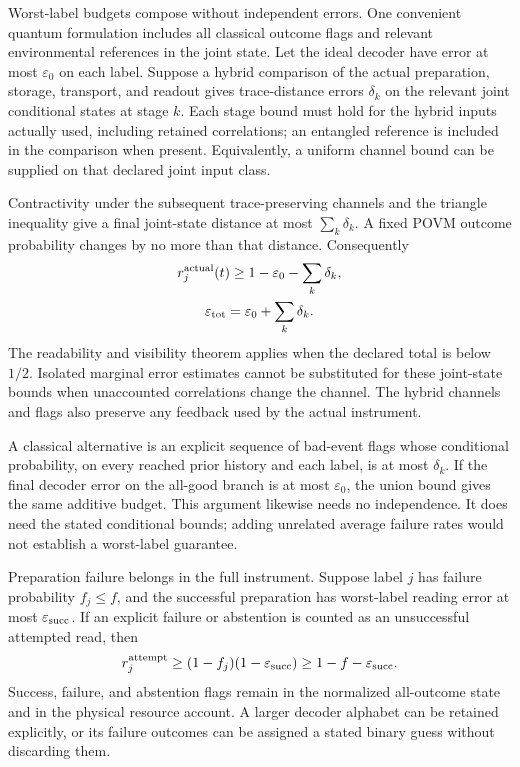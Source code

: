 Worst-label budgets compose without independent errors. One convenient
quantum formulation includes all classical outcome flags and relevant
environmental references in the joint state. Let the ideal decoder have
error at most $\varepsilon_0$ on each label. Suppose a hybrid comparison
of the actual preparation, storage, transport, and readout gives
trace-distance errors $\delta_k$ on the relevant joint conditional states
at stage $k$. Each stage bound must hold for the hybrid inputs actually
used, including retained correlations; an entangled reference is included
in the comparison when present. Equivalently, a uniform channel bound
can be supplied on that declared joint input class.

Contractivity under the subsequent trace-preserving channels and the
triangle inequality give a final joint-state distance at most
$\sum_k\delta_k$. A fixed POVM outcome probability changes by no more
than that distance. Consequently
\begin{equation}
\begin{gathered}
r_j^{\rm actual}(t)\geq
       1-\varepsilon_0-\sum_k\delta_k,
 \\
 \varepsilon_{\rm tot}=\varepsilon_0+\sum_k\delta_k.
\end{gathered}
\label{eq:chvif-additive-record-budget}
\end{equation}
The readability and visibility theorem applies when the declared total is
below $1/2$. Isolated marginal error estimates cannot be substituted for
these joint-state bounds when unaccounted correlations change the channel.
The hybrid channels and flags also preserve any feedback used by the
actual instrument.

A classical alternative is an explicit sequence of bad-event flags whose
conditional probability, on every reached prior history and each label,
is at most $\delta_k$. If the final decoder error on the all-good branch
is at most $\varepsilon_0$, the union bound gives the same additive
budget. This argument likewise needs no independence. It does need the
stated conditional bounds; adding unrelated average failure rates would
not establish a worst-label guarantee.

Preparation failure belongs in the full instrument. Suppose label $j$ has
failure probability $f_j\leq f$, and the successful preparation has
worst-label reading error at most $\varepsilon_{\rm succ}$. If an explicit
failure or abstention is counted as an unsuccessful attempted read, then
\begin{equation}
 r_j^{\rm attempt}\geq
       (1-f_j)(1-\varepsilon_{\rm succ})
       \geq1-f-\varepsilon_{\rm succ}.
 \label{eq:chvif-preparation-failure-record}
\end{equation}
Success, failure, and abstention flags remain in the normalized all-outcome
state and in the physical resource account. A larger decoder alphabet can
be retained explicitly, or its failure outcomes can be assigned a stated
binary guess without discarding them.

